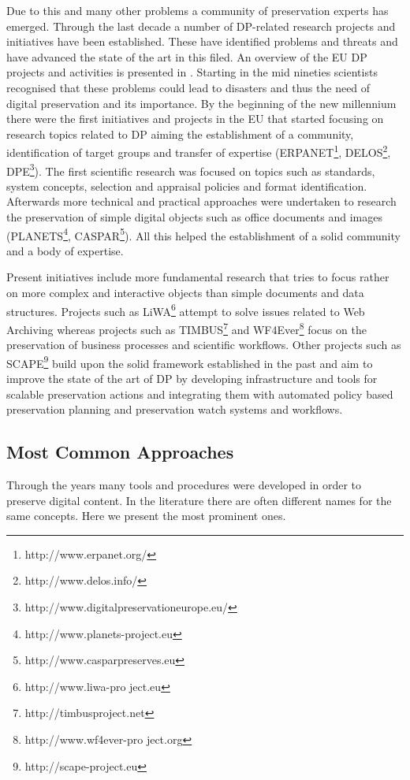 Due to this and many other problems a community of preservation experts has emerged. Through the last decade a number of DP-related research projects and initiatives have been established. These have identified problems and threats and have advanced the state of the art in this filed. An overview of the EU DP projects and activities is presented in \cite{strodl:2011:dpreport}. Starting in the mid nineties scientists recognised that these problems could lead to disasters and thus the need of digital preservation and its importance. By the beginning of the new millennium there were the first initiatives and projects in the EU that started focusing on research topics related to DP aiming the establishment of a community, identification of target groups and transfer of expertise (ERPANET\footnote{http://www.erpanet.org/}, DELOS\footnote{http://www.delos.info/}, DPE\footnote{http://www.digitalpreservationeurope.eu/}). The first scientific research was focused on topics such as standards, system concepts, selection and appraisal policies and format identification. Afterwards more technical and practical approaches were undertaken to research the preservation of simple digital objects such as office documents and images (PLANETS\footnote{http://www.planets-project.eu}, CASPAR\footnote{http://www.casparpreserves.eu}). All this helped the establishment of a solid community and a body of expertise.

Present initiatives include more fundamental research that tries to focus rather on more complex and interactive objects than simple documents and data structures. Projects such as LiWA\footnote{http://www.liwa-pro ject.eu} attempt to solve issues related to Web Archiving whereas projects such as TIMBUS\footnote{http://timbusproject.net} and WF4Ever\footnote{http://www.wf4ever-pro ject.org} focus on the preservation of business processes and scientific workflows.
Other projects such as SCAPE\footnote{http://scape-project.eu} build upon the solid framework established in the past and aim to improve the state of the art of DP by developing infrastructure and tools for scalable preservation actions and integrating them with automated policy based preservation planning and preservation watch systems and workflows.

\subsection{Most Common Approaches}
Through the years many tools and procedures were developed in order to preserve digital content. In the literature there are often different names for the same concepts. Here we present the most prominent ones. \newline

